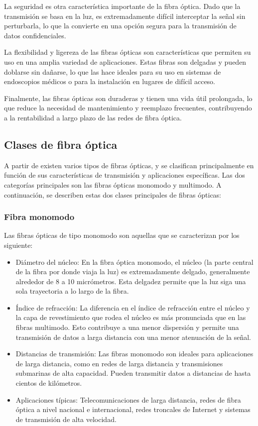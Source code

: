\documentclass[10.5pt]{article}
\begin{document}
    La seguridad es otra característica importante de la fibra óptica. Dado que la transmisión se basa en la luz, es extremadamente difícil interceptar la señal sin perturbarla, lo que la convierte en una opción segura para la transmisión de datos confidenciales.

    La flexibilidad y ligereza de las fibras ópticas son características que permiten su uso en una amplia variedad de aplicaciones. Estas fibras son delgadas y pueden doblarse sin dañarse, lo que las hace ideales para su uso en sistemas de endoscopios médicos o para la instalación en lugares de difícil acceso.

    Finalmente, las fibras ópticas son duraderas y tienen una vida útil prolongada, lo que reduce la necesidad de mantenimiento y reemplazo frecuentes, contribuyendo a la rentabilidad a largo plazo de las redes de fibra óptica.
    \subsection{Clases de fibra óptica}
    A partir de existen varios tipos de fibras ópticas, y se clasifican principalmente en función de sus características de transmisión y aplicaciones específicas. Las dos categorías principales son las fibras ópticas monomodo y multimodo. A continuación, se describen estas dos clases principales de fibras ópticas:
    \subsubsection{Fibra monomodo}
    Las fibras ópticas de tipo monomodo son aquellas que se caracterizan por los siguiente:
    \begin{itemize}
        \item Diámetro del núcleo: En la fibra óptica monomodo, el núcleo (la parte central de la fibra por donde viaja la luz) es extremadamente delgado, generalmente alrededor de 8 a 10 micrómetros. Esta delgadez permite que la luz siga una sola trayectoria a lo largo de la fibra.
        \item Índice de refracción: La diferencia en el índice de refracción entre el núcleo y la capa de revestimiento que rodea el núcleo es más pronunciada que en las fibras multimodo. Esto contribuye a una menor dispersión y permite una transmisión de datos a larga distancia con una menor atenuación de la señal.
        \item Distancias de transmisión: Las fibras monomodo son ideales para aplicaciones de larga distancia, como en redes de larga distancia y transmisiones submarinas de alta capacidad. Pueden transmitir datos a distancias de hasta cientos de kilómetros.
        \item Aplicaciones típicas: Telecomunicaciones de larga distancia, redes de fibra óptica a nivel nacional e internacional, redes troncales de Internet y sistemas de transmisión de alta velocidad.
    \end{itemize}
\end{document}
